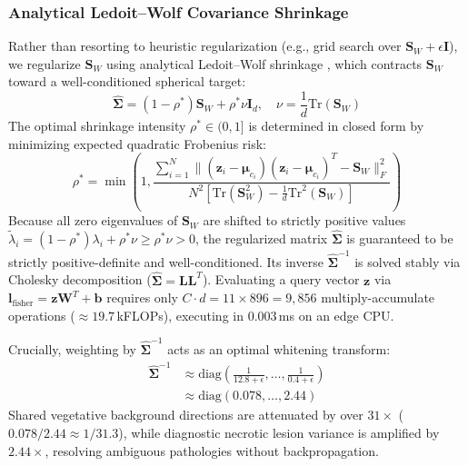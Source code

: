 \documentclass[a4paper,fleqn,nologo]{cas-dc}
\begin{document}
\subsubsection{Analytical Ledoit--Wolf Covariance Shrinkage}
\label{sec:shrinkage}
Rather than resorting to heuristic regularization (e.g., grid search over $\mathbf{S}_W + \epsilon \mathbf{I}$), we regularize $\mathbf{S}_W$ using analytical Ledoit--Wolf shrinkage \cite{ledoit2004well}, which contracts $\mathbf{S}_W$ toward a well-conditioned spherical target:
\begin{equation}
    \hat{\mathbf{\Sigma}} = (1 - \rho^*)\mathbf{S}_W + \rho^* \nu \mathbf{I}_{d}, \quad \nu = \frac{1}{d}\text{Tr}(\mathbf{S}_W)
    \label{eq:lw_target}
\end{equation}
The optimal shrinkage intensity $\rho^* \in (0, 1]$ is determined in closed form by minimizing expected quadratic Frobenius risk:
\begin{equation}
    \rho^* = \min\left(1, \frac{\sum_{i=1}^N \|(\mathbf{z}_i - \boldsymbol{\mu}_{c_i})(\mathbf{z}_i - \boldsymbol{\mu}_{c_i})^T - \mathbf{S}_W\|_F^2}{N^2 \left[\text{Tr}(\mathbf{S}_W^2) - \frac{1}{d}\text{Tr}^2(\mathbf{S}_W)\right]}\right)
    \label{eq:lw_shrinkage}
\end{equation}
Because all zero eigenvalues of $\mathbf{S}_W$ are shifted to strictly positive values $\tilde{\lambda}_i = (1 - \rho^*)\lambda_i + \rho^* \nu \ge \rho^* \nu > 0$, the regularized matrix $\hat{\mathbf{\Sigma}}$ is guaranteed to be strictly positive-definite and well-conditioned. Its inverse $\hat{\mathbf{\Sigma}}^{-1}$ is solved stably via Cholesky decomposition ($\hat{\mathbf{\Sigma}} = \mathbf{L}\mathbf{L}^T$). Evaluating a query vector $\mathbf{z}$ via $\mathbf{l}_{\text{fisher}} = \mathbf{z}\mathbf{W}^T + \mathbf{b}$ requires only $C \cdot d = 11 \times 896 = 9{,}856$ multiply-accumulate operations ($\approx 19.7$\,kFLOPs), executing in 0.003\,ms on an edge CPU.

Crucially, weighting by $\hat{\mathbf{\Sigma}}^{-1}$ acts as an optimal whitening transform:
\begin{align}
    \hat{\mathbf{\Sigma}}^{-1} &\approx \text{diag}\left(\frac{1}{12.8 + \epsilon}, \dots, \frac{1}{0.4 + \epsilon}\right) \nonumber \\
    &\approx \text{diag}(0.078, \dots, 2.44)
\end{align}
Shared vegetative background directions are attenuated by over $31\times$ ($0.078 / 2.44 \approx 1/31.3$), while diagnostic necrotic lesion variance is amplified by $2.44\times$, resolving ambiguous pathologies without backpropagation.
\end{document}
